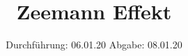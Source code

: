 

\subject{V27}
\title{Zeemann Effekt}
\date{%
  Durchführung: 06.01.20
  \hspace{3em}
  Abgabe: 08.01.20
}



\maketitle
\thispagestyle{empty}
\tableofcontents
\newpage







\printbibliography{}


